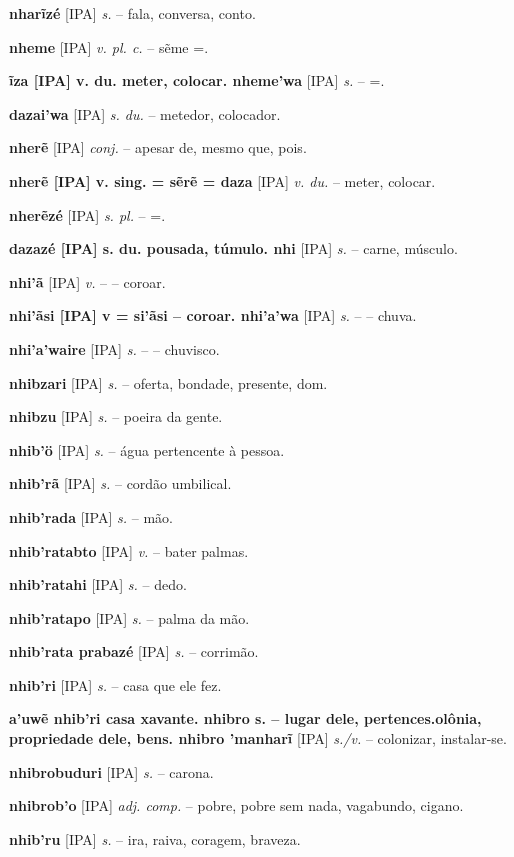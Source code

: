 \textbf{nharĩzé} [IPA] \textit{s.} -- fala, conversa, conto.

\textbf{nheme} [IPA] \textit{v. pl. c.} -- sẽme =.

\textbf{ĩza [IPA] v. du. meter, colocar. nheme'wa} [IPA] \textit{s.} -- =.

\textbf{dazai'wa} [IPA] \textit{s. du.} -- metedor, colocador.

\textbf{nherẽ} [IPA] \textit{conj.} -- apesar de, mesmo que, pois.

\textbf{nherẽ [IPA] v. sing. = sẽrẽ = daza} [IPA] \textit{v. du.} -- meter, colocar.

\textbf{nherẽzé} [IPA] \textit{s. pl.} -- =.

\textbf{dazazé [IPA] s. du. pousada, túmulo. nhi} [IPA] \textit{s.} -- carne, músculo.

\textbf{nhi'ã} [IPA] \textit{v.} -- -- coroar.

\textbf{nhi'ãsi [IPA] v = si'ãsi -- coroar. nhi'a'wa} [IPA] \textit{s.} -- -- chuva.

\textbf{nhi'a'waire} [IPA] \textit{s.} -- -- chuvisco.

\textbf{nhibzari} [IPA] \textit{s.} -- oferta, bondade, presente, dom.

\textbf{nhibzu} [IPA] \textit{s.} -- poeira da gente.

\textbf{nhib'ö} [IPA] \textit{s.} -- água pertencente à pessoa.

\textbf{nhib'rã} [IPA] \textit{s.} -- cordão umbilical.

\textbf{nhib'rada} [IPA] \textit{s.} -- mão.

\textbf{nhib'ratabto} [IPA] \textit{v.} -- bater palmas.

\textbf{nhib'ratahi} [IPA] \textit{s.} -- dedo.

\textbf{nhib'ratapo} [IPA] \textit{s.} -- palma da mão.

\textbf{nhib'rata prabazé} [IPA] \textit{s.} -- corrimão.

\textbf{nhib'ri} [IPA] \textit{s.} -- casa que ele fez.

\textbf{a'uwẽ nhib'ri casa xavante. nhibro s. -- lugar dele, pertences.olônia, propriedade dele, bens. nhibro 'manharĩ} [IPA] \textit{s./v.} -- colonizar, instalar-se.

\textbf{nhibrobuduri} [IPA] \textit{s.} -- carona.

\textbf{nhibrob'o} [IPA] \textit{adj. comp.} -- pobre, pobre sem nada, vagabundo, cigano.

\textbf{nhib'ru} [IPA] \textit{s.} -- ira, raiva, coragem, braveza.

